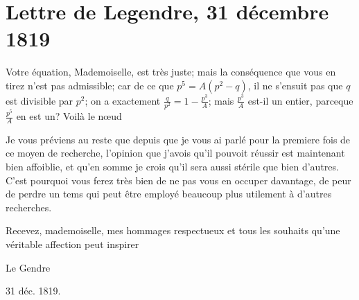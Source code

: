 \documentclass[11pt,a4paper]{article}
\begin{document}
\section{Lettre de Legendre, 31 décembre 1819}

Votre équation, Mademoiselle, est très juste; mais la conséquence que vous
en tirez n'est pas admissible; car de ce que $p^5 = A(p^2 - q)$, il ne
s'ensuit pas que $q$ est divisible par $p^2$; on a exactement
$\frac{q}{p^2} = 1 - \frac{p^3}{A}$; mais $\frac{p^3}{A}$ est-il un entier,
parceque $\frac{p^5}{A}$ en est un? Voilà le nœud

Je vous préviens au reste que depuis que je vous ai parlé pour la premiere
fois de ce moyen de recherche, l'opinion que j'avois  qu'il
pouvoit réussir est maintenant bien affoiblie, \struck{\ill{}} et qu'en
somme je crois qu'il sera aussi stérile que bien d'autres. C'est pourquoi
vous ferez très bien de ne pas vous en occuper davantage, de peur de perdre
un tems qui peut être employé beaucoup plus utilement à d'autres recherches.

Recevez, mademoiselle, mes hommages respectueux et tous les souhaits qu'une
véritable affection peut inspirer

Le Gendre

31 déc. 1819.

\end{document}
